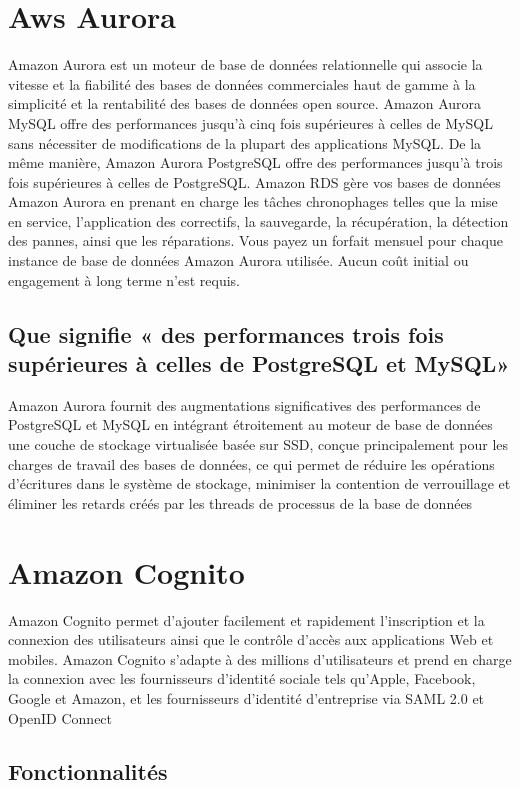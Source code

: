 \section{Aws Aurora}

Amazon Aurora est un moteur de base de données relationnelle qui associe la vitesse et la fiabilité des bases
de données commerciales haut de gamme à la simplicité et la rentabilité des bases de données open source.
Amazon Aurora MySQL offre des performances jusqu’à cinq fois supérieures à celles de MySQL sans
nécessiter de modifications de la plupart des applications MySQL. De la même manière, Amazon Aurora
PostgreSQL offre des performances jusqu’à trois fois supérieures à celles de PostgreSQL. Amazon RDS
gère vos bases de données Amazon Aurora en prenant en charge les tâches chronophages telles que la mise en service, l’application des correctifs, la sauvegarde, la récupération, la détection des pannes, ainsi que
les réparations. Vous payez un forfait mensuel pour chaque instance de base de données Amazon Aurora
utilisée. Aucun coût initial ou engagement à long terme n’est requis.

\subsection{Que signifie « des performances trois fois supérieures à celles de PostgreSQL  et MySQL» }
Amazon Aurora fournit des augmentations significatives des performances de PostgreSQL et  MySQL en intégrant étroitement au moteur de base de données une couche de stockage virtualisée basée sur SSD, conçue principalement pour les charges de travail des bases de données, ce qui permet de réduire les opérations d'écritures dans le système de stockage, minimiser la contention de verrouillage et éliminer les retards créés par les threads de processus de la base de données

\section{Amazon Cognito}
Amazon Cognito permet d’ajouter facilement et rapidement l’inscription et la connexion des utilisateurs
ainsi que le contrôle d’accès aux applications Web et mobiles. Amazon Cognito s’adapte à des millions
d’utilisateurs et prend en charge la connexion avec les fournisseurs d’identité sociale tels qu’Apple, Facebook, Google et Amazon, et les fournisseurs d’identité d’entreprise via SAML 2.0 et OpenID Connect

\subsection{Fonctionnalités}
